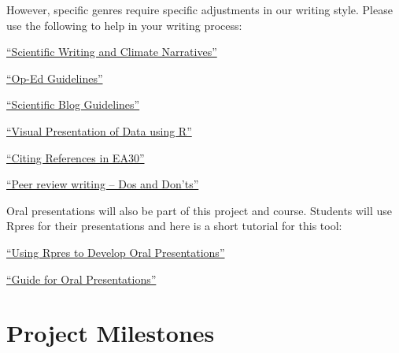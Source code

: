 \documentclass{article}\usepackage[]{graphicx}\usepackage[]{color}
\newenvironment{itemize*}%
  {\begin{itemize}%
    \setlength{\itemsep}{0pt}%
    \setlength{\parskip}{0pt}}%
  {\end{itemize}}
\begin{document}
However, specific genres require specific adjustments in our writing style. Please use the following to help in your writing process:

\begin{itemize*}
  \item \href{https://github.com/marclos/Climate_Change_Narratives/raw/master/Communication_Resources/Writing_About_Climate.pdf}{``Scientific Writing and Climate Narratives''}

  \item \href{https://github.com/marclos/Climate_Change_Narratives/raw/master/Communication_Resources/Op-Ed_Guidelines.pdf}{``Op-Ed Guidelines''}
  
  \item \href{https://github.com/marclos/Climate_Change_Narratives/raw/master/Communication_Resources/Scientific_Blog_Guidelines.pdf}{``Scientific Blog Guidelines''}
  
  
  \item \href{https://github.com/marclos/Climate_Change_Narratives/raw/master/Communication_Resources/Visualing_Data.pdf}{``Visual Presentation of Data using R''}
  
  \item \href{https://github.com/marclos/Climate_Change_Narratives/raw/master/Communication_Resources/Citing_Sources.pdf}{``Citing References in EA30''}
  
  \item \href{https://github.com/marclos/Climate_Change_Narratives/raw/master/Communication_Resources/Peer_Review-Dos_and_Donts.pdf}{``Peer review writing -- Dos and Don'ts''}
\end{itemize*}

Oral presentations will also be part of this project and course. Students will use Rpres for their presentations and here is a short tutorial for this tool:

\begin{itemize*}
  \item \href{https://github.com/marclos/Climate_Change_Narratives/raw/master/Communication_Resources/TBD.pdf}{``Using Rpres to Develop Oral Presentations''}
  
  \item \href{https://github.com/marclos/Climate_Change_Narratives/raw/master/Communication_Resources/TBD.pdf}{``Guide for Oral Presentations''}
\end{itemize*}

\section{Project Milestones}
\end{document}
